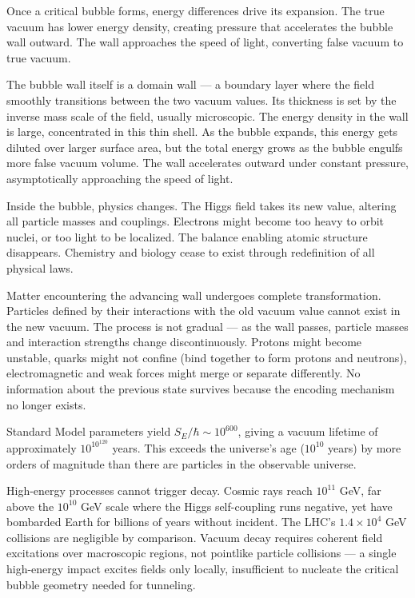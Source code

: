 Once a critical bubble forms, energy differences drive its expansion. The true vacuum has lower energy density, creating pressure that accelerates the bubble wall outward. The wall approaches the speed of light, converting false vacuum to true vacuum.

The bubble wall itself is a domain wall — a boundary layer where the field smoothly transitions between the two vacuum values. Its thickness is set by the inverse mass scale of the field, usually microscopic. The energy density in the wall is large, concentrated in this thin shell. As the bubble expands, this energy gets diluted over larger surface area, but the total energy grows as the bubble engulfs more false vacuum volume. The wall accelerates outward under constant pressure, asymptotically approaching the speed of light.

Inside the bubble, physics changes. The Higgs field takes its new value, altering all particle masses and couplings. Electrons might become too heavy to orbit nuclei, or too light to be localized. The balance enabling atomic structure disappears. Chemistry and biology cease to exist through redefinition of all physical laws.

Matter encountering the advancing wall undergoes complete transformation. Particles defined by their interactions with the old vacuum value cannot exist in the new vacuum. The process is not gradual — as the wall passes, particle masses and interaction strengths change discontinuously. Protons might become unstable, quarks might not confine (bind together to form protons and neutrons), electromagnetic and weak forces might merge or separate differently. No information about the previous state survives because the encoding mechanism no longer exists.

Standard Model parameters yield $S_E/\hbar \sim 10^{600}$, giving a vacuum lifetime of approximately $10^{10^{120}}$ years. This exceeds the universe's age ($10^{10}$ years) by more orders of magnitude than there are particles in the observable universe.

High-energy processes cannot trigger decay. Cosmic rays reach $10^{11}$ GeV, far above the $10^{10}$ GeV scale where the Higgs self-coupling runs negative, yet have bombarded Earth for billions of years without incident. The LHC's $1.4 \times 10^4$ GeV collisions are negligible by comparison. Vacuum decay requires coherent field excitations over macroscopic regions, not pointlike particle collisions — a single high-energy impact excites fields only locally, insufficient to nucleate the critical bubble geometry needed for tunneling.

